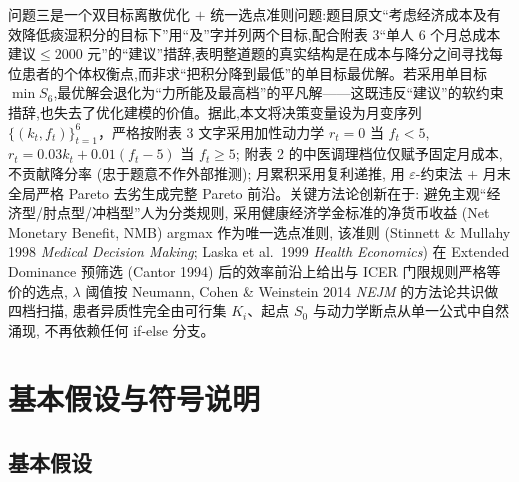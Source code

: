\documentclass{MathorCupmodeling}
\begin{document}
问题三是一个双目标离散优化 $+$ 统一选点准则问题:题目原文``考虑经济成本及有效降低痰湿积分的目标下''用``及''字并列两个目标,配合附表 3``单人 6 个月总成本建议$\le 2000$ 元''的``建议''措辞,表明整道题的真实结构是在成本与降分之间寻找每位患者的个体权衡点,而非求``把积分降到最低''的单目标最优解。若采用单目标 $\min S_6$,最优解会退化为``力所能及最高档''的平凡解——这既违反``建议''的软约束措辞,也失去了优化建模的价值。据此,本文将决策变量设为月变序列 $\{(k_t,f_t)\}_{t=1}^{6}$，严格按附表 3 文字采用加性动力学 $r_t = 0$ 当 $f_t<5$, $r_t = 0.03k_t + 0.01(f_t-5)$ 当 $f_t\ge 5$; 附表 2 的中医调理档位仅赋予固定月成本, 不贡献降分率 (忠于题意不作外部推测); 月累积采用复利递推, 用 $\varepsilon$-约束法 + 月末全局严格 Pareto 去劣生成完整 Pareto 前沿。关键方法论创新在于: 避免主观``经济型/肘点型/冲档型''人为分类规则, 采用健康经济学金标准的净货币收益 (Net Monetary Benefit, NMB) argmax 作为唯一选点准则, 该准则 (Stinnett \& Mullahy 1998 \textit{Medical Decision Making}; Laska et al.~1999 \textit{Health Economics}) 在 Extended Dominance 预筛选 (Cantor 1994) 后的效率前沿上给出与 ICER 门限规则严格等价的选点, $\lambda$ 阈值按 Neumann, Cohen \& Weinstein 2014 \textit{NEJM} 的方法论共识做四档扫描, 患者异质性完全由可行集 $K_i$、起点 $S_0$ 与动力学断点从单一公式中自然涌现, 不再依赖任何 if-else 分支。


\section{基本假设与符号说明}

\subsection{基本假设}
\end{document}
